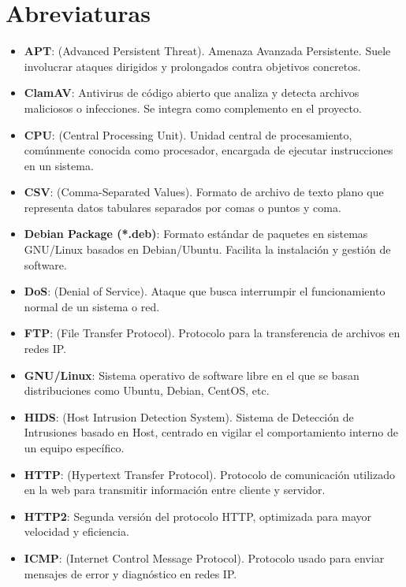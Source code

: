 \documentclass[11pt,a4paper,twoside]{report}
\begin{document}
	\newcommand{\listoflistingscaption}{Índice de Códigos}
	
	\lstlistoflistings
	\newpage
	
	
	
	


\chapter*{Abreviaturas}
\begin{itemize}
	\item \textbf{APT}: (Advanced Persistent Threat). Amenaza Avanzada Persistente. Suele involucrar ataques dirigidos y prolongados contra objetivos concretos.
	\item \textbf{ClamAV}: Antivirus de código abierto que analiza y detecta archivos maliciosos o infecciones. Se integra como complemento en el proyecto.
	\item \textbf{CPU}: (Central Processing Unit). Unidad central de procesamiento, comúnmente conocida como procesador, encargada de ejecutar instrucciones en un sistema.
	\item \textbf{CSV}: (Comma-Separated Values). Formato de archivo de texto plano que representa datos tabulares separados por comas o puntos y coma.
	\item \textbf{Debian Package (*.deb)}: Formato estándar de paquetes en sistemas GNU/Linux basados en Debian/Ubuntu. Facilita la instalación y gestión de software.
	\item \textbf{DoS}: (Denial of Service). Ataque que busca interrumpir el funcionamiento normal de un sistema o red.
	\item \textbf{FTP}: (File Transfer Protocol). Protocolo para la transferencia de archivos en redes IP.
	\item \textbf{GNU/Linux}: Sistema operativo de software libre en el que se basan distribuciones como Ubuntu, Debian, CentOS, etc.
	\item \textbf{HIDS}: (Host Intrusion Detection System). Sistema de Detección de Intrusiones basado en Host, centrado en vigilar el comportamiento interno de un equipo específico.
	\item \textbf{HTTP}: (Hypertext Transfer Protocol). Protocolo de comunicación utilizado en la web para transmitir información entre cliente y servidor.
	\item \textbf{HTTP2}: Segunda versión del protocolo HTTP, optimizada para mayor velocidad y eficiencia.
	\item \textbf{ICMP}: (Internet Control Message Protocol). Protocolo usado para enviar mensajes de error y diagnóstico en redes IP.

\end{itemize}
\end{document}
